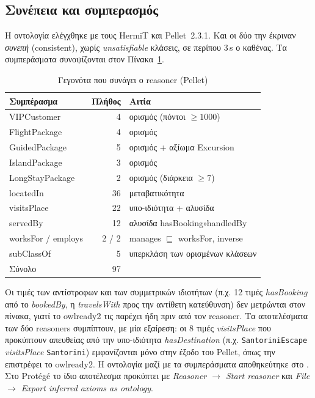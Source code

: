 \documentclass[conference]{IEEEtran}
\newcommand{\prop}[1]{\textit{#1}}         %
\newcommand{\ind}[1]{\texttt{#1}}          %
\begin{document}
\subsection{Συνέπεια και συμπερασμός}

Η οντολογία ελέγχθηκε με τους HermiT και Pellet~2.3.1. Και οι δύο την έκριναν
\emph{συνεπή} (consistent), χωρίς \emph{unsatisfiable} κλάσεις, σε περίπου 3\,s
ο καθένας. Τα συμπεράσματα συνοψίζονται στον Πίνακα~\ref{tab:inferred}.

\begin{table}[!t]
\caption{Γεγονότα που συνάγει ο reasoner (Pellet)}
\label{tab:inferred}
\centering\scriptsize
\setlength{\tabcolsep}{3pt}
\begin{tabular}{@{}lrl@{}}
\toprule
Συμπέρασμα & Πλήθος & Αιτία \\
\midrule
VIPCustomer & 4 & ορισμός (πόντοι $\geq 1000$) \\
FlightPackage & 4 & ορισμός \\
GuidedPackage & 5 & ορισμός + αξίωμα Excursion \\
IslandPackage & 3 & ορισμός \\
LongStayPackage & 2 & ορισμός (διάρκεια $\geq 7$) \\
locatedIn & 36 & μεταβατικότητα \\
visitsPlace & 22 & υπο-ιδιότητα + αλυσίδα \\
servedBy & 12 & αλυσίδα hasBooking$\circ$handledBy \\
worksFor / employs & 2 / 2 & manages $\sqsubseteq$ worksFor, inverse \\
subClassOf & 5 & υπερκλάση των ορισμένων κλάσεων \\
\midrule
Σύνολο & 97 & \\
\bottomrule
\end{tabular}
\end{table}

Οι τιμές των αντίστροφων και των συμμετρικών ιδιοτήτων (π.χ. 12 τιμές
\prop{hasBooking} από το \prop{bookedBy}, η \prop{travelsWith} προς την αντίθετη
κατεύθυνση) δεν μετρώνται στον πίνακα, γιατί το owlready2 τις παρέχει ήδη πριν από
τον reasoner. Τα αποτελέσματα των δύο reasoners συμπίπτουν, με μία εξαίρεση: οι 8
τιμές \prop{visitsPlace} που προκύπτουν απευθείας από την υπο-ιδιότητα
\prop{hasDestination} (π.χ. \ind{SantoriniEscape} \prop{visitsPlace}
\ind{Santorini}) εμφανίζονται μόνο στην έξοδο του Pellet, όπως την επιστρέφει το
owlready2. Η οντολογία μαζί με τα συμπεράσματα αποθηκεύτηκε στο
. Στο Protégé το ίδιο αποτέλεσμα προκύπτει με
\emph{Reasoner $\rightarrow$ Start reasoner} και \emph{File $\rightarrow$ Export
inferred axioms as ontology}.
\end{document}
